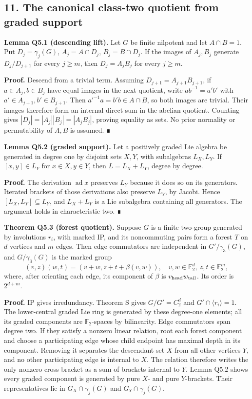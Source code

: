\documentclass[
  10pt,
  letterpaper,
]{article}
\begin{document}
\subsection{11. The canonical class-two quotient from graded
support}\label{the-canonical-class-two-quotient-from-graded-support}

\textbf{Lemma Q5.1 (descending lift).} Let \(G\) be finite nilpotent and
let \(A\cap B=1\). Put \(D_j=\gamma_j(G)\), \(A_j=A\cap D_j\),
\(B_j=B\cap D_j\). If the images of \(A_j,B_j\) generate \(D_j/D_{j+1}\)
for every \(j\ge m\), then \(D_j=A_jB_j\) for every \(j\ge m\).

\textbf{Proof.} Descend from a trivial term. Assuming
\(D_{j+1}=A_{j+1}B_{j+1}\), if \(a\in A_j,b\in B_j\) have equal images
in the next quotient, write \(ab^{-1}=a'b'\) with
\(a'\in A_{j+1},b'\in B_{j+1}\). Then \(a'^{-1}a=b'b\in A\cap B\), so
both images are trivial. Their images therefore form an internal direct
sum in the abelian quotient. Counting gives
\(|D_j|=|A_j||B_j|=|A_jB_j|\), proving equality as sets. No prior
normality or permutability of \(A,B\) is assumed. ∎

\textbf{Lemma Q5.2 (graded support).} Let a positively graded Lie
algebra be generated in degree one by disjoint sets \(X,Y\), with
subalgebras \(L_X,L_Y\). If \([x,y]\in L_Y\) for \(x\in X,y\in Y\), then
\(L=L_X+L_Y\), degree by degree.

\textbf{Proof.} The derivation \(\operatorname{ad}x\) preserves \(L_Y\)
because it does so on its generators. Iterated brackets of those
derivations also preserve \(L_Y\), by Jacobi. Hence
\([L_X,L_Y]\subseteq L_Y\), and \(L_X+L_Y\) is a Lie subalgebra
containing all generators. The argument holds in characteristic two. ∎

\textbf{Theorem Q5.3 (forest quotient).} Suppose \(G\) is a finite
two-group generated by involutions \(r_i\), with marked IP, and its
noncommuting pairs form a forest \(T\) on \(d\) vertices and \(m\)
edges. Then edge commutators are independent in \(G'/\gamma_3(G)\), and
\(G/\gamma_3(G)\) is the marked group \[
 (v,z)(w,t)=(v+w,z+t+\beta(v,w)),\quad
 v,w\in\mathbb F_2^d,\ z,t\in\mathbb F_2^m,               \tag{Q5.1}
\] where, after orienting each edge, its component of \(\beta\) is
\(v_{\rm head}w_{\rm tail}\). Its order is \(2^{d+m}\).

\textbf{Proof.} IP gives irredundancy. Theorem S gives \(G/G'=C_2^d\)
and \(G'\cap\langle r_i\rangle=1\). The lower-central graded Lie ring is
generated by these degree-one elements; all its graded components are
\(\mathbb F_2\)-spaces by bilinearity. Edge commutators span degree two.
If they satisfy a nonzero linear relation, root each forest component
and choose a participating edge whose child endpoint has maximal depth
in its component. Removing it separates the descendant set \(X\) from
all other vertices \(Y\), and no other participating edge is internal to
\(X\). The relation therefore writes the only nonzero cross bracket as a
sum of brackets internal to \(Y\). Lemma Q5.2 shows every graded
component is generated by pure \(X\)- and pure \(Y\)-brackets. Their
representatives lie in \(G_X\cap\gamma_j(G)\) and
\(G_Y\cap\gamma_j(G)\).
\end{document}
